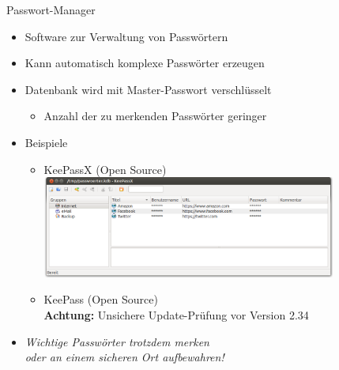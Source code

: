 \begin{frame}{Passwort-Manager}
  \begin{itemize}
    \item Software zur Verwaltung von Passwörtern
    \item Kann automatisch komplexe Passwörter erzeugen
    \item Datenbank wird mit Master-Passwort verschlüsselt
    \begin{itemize}
      \item Anzahl der zu merkenden Passwörter geringer
    \end{itemize}
    \item Beispiele
    \begin{itemize}
      \item KeePassX (Open Source)
         \includegraphics[width=0.8\textwidth]{images/keepassx.png}
      \item KeePass (Open Source)\\
        \textbf{Achtung:} Unsichere Update-Prüfung vor Version 2.34
    \end{itemize}
  \end{itemize}
  \begin{itemize}
    \item \emph{Wichtige Passwörter trotzdem merken\\oder an einem sicheren Ort aufbewahren!}
  \end{itemize}
\end{frame}

\endinput
